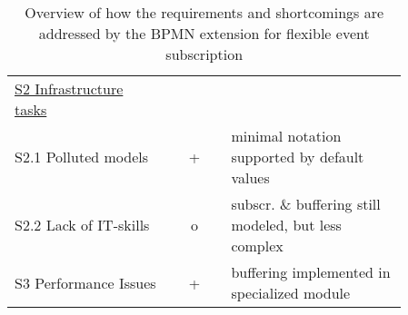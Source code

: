 \begin{table}
\begin{tabularx}{\textwidth}{p{0.4\linewidth} | c | p{0.455\linewidth}}
		\rule{0pt}{4ex}\underline{S2 Infrastructure tasks} & & \\
		S2.1 Polluted models & + & minimal notation supported by default values \\
		S2.2 Lack of IT-skills & o & subscr. \& buffering still modeled, but less complex \\
		
		\rule{0pt}{4ex}S3 Performance Issues & + & buffering implemented in specialized module \\		
		
	\end{tabularx}
	\caption[Overview of how the requirements and shortcomings are addressed by the BPMN extension for flexible event subscription]{Overview of how the requirements and shortcomings are addressed by the BPMN extension for flexible event subscription}
	\label{tab:concept-vs-requirements}
\end{table}